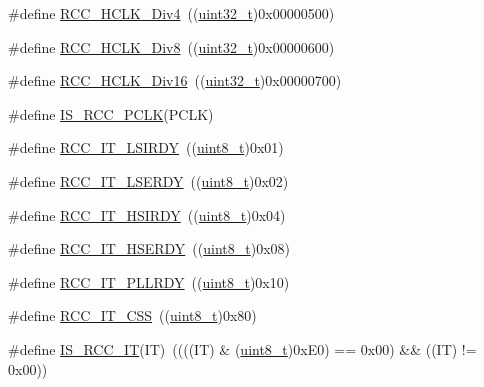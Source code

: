 \begin{DoxyCompactItemize}
\#define \hyperlink{group___a_p_b1___a_p_b2__clock__source_gafd8cf0e32a3ea5648cdc054766bc2017}{R\+C\+C\+\_\+\+H\+C\+L\+K\+\_\+\+Div4}~((\hyperlink{_p_e___types_8h_a33594304e786b158f3fb30289278f5af}{uint32\+\_\+t})0x00000500)
\item 
\#define \hyperlink{group___a_p_b1___a_p_b2__clock__source_gab2e2b6e0b8fe22d6638b672918b22097}{R\+C\+C\+\_\+\+H\+C\+L\+K\+\_\+\+Div8}~((\hyperlink{_p_e___types_8h_a33594304e786b158f3fb30289278f5af}{uint32\+\_\+t})0x00000600)
\item 
\#define \hyperlink{group___a_p_b1___a_p_b2__clock__source_ga6353aaa0b302fdd5d946fd21756e2273}{R\+C\+C\+\_\+\+H\+C\+L\+K\+\_\+\+Div16}~((\hyperlink{_p_e___types_8h_a33594304e786b158f3fb30289278f5af}{uint32\+\_\+t})0x00000700)
\item 
\#define \hyperlink{group___a_p_b1___a_p_b2__clock__source_gab70f1257ea47c1da4def8e351af4d9f2}{I\+S\+\_\+\+R\+C\+C\+\_\+\+P\+C\+LK}(P\+C\+LK)
\item 
\#define \hyperlink{group___r_c_c___interrupt__source_ga2b4ef277c1b71f96e0bef4b9a72fca94}{R\+C\+C\+\_\+\+I\+T\+\_\+\+L\+S\+I\+R\+DY}~((\hyperlink{_p_e___types_8h_aba7bc1797add20fe3efdf37ced1182c5}{uint8\+\_\+t})0x01)
\item 
\#define \hyperlink{group___r_c_c___interrupt__source_gad6b6e78a426850f595ef180d292a673d}{R\+C\+C\+\_\+\+I\+T\+\_\+\+L\+S\+E\+R\+DY}~((\hyperlink{_p_e___types_8h_aba7bc1797add20fe3efdf37ced1182c5}{uint8\+\_\+t})0x02)
\item 
\#define \hyperlink{group___r_c_c___interrupt__source_ga69637e51b71f73f519c8c0a0613d042f}{R\+C\+C\+\_\+\+I\+T\+\_\+\+H\+S\+I\+R\+DY}~((\hyperlink{_p_e___types_8h_aba7bc1797add20fe3efdf37ced1182c5}{uint8\+\_\+t})0x04)
\item 
\#define \hyperlink{group___r_c_c___interrupt__source_gad13eaede352bca59611e6cae68665866}{R\+C\+C\+\_\+\+I\+T\+\_\+\+H\+S\+E\+R\+DY}~((\hyperlink{_p_e___types_8h_aba7bc1797add20fe3efdf37ced1182c5}{uint8\+\_\+t})0x08)
\item 
\#define \hyperlink{group___r_c_c___interrupt__source_ga68d48e7811fb58f2649dce6cf0d823d9}{R\+C\+C\+\_\+\+I\+T\+\_\+\+P\+L\+L\+R\+DY}~((\hyperlink{_p_e___types_8h_aba7bc1797add20fe3efdf37ced1182c5}{uint8\+\_\+t})0x10)
\item 
\#define \hyperlink{group___r_c_c___interrupt__source_ga9bb34a4912d2084dc1c0834eb53aa7a3}{R\+C\+C\+\_\+\+I\+T\+\_\+\+C\+SS}~((\hyperlink{_p_e___types_8h_aba7bc1797add20fe3efdf37ced1182c5}{uint8\+\_\+t})0x80)
\item 
\#define \hyperlink{group___r_c_c___interrupt__source_ga710d72ccf88ddbec09b033c81a571a83}{I\+S\+\_\+\+R\+C\+C\+\_\+\+IT}(IT)~((((IT) \& (\hyperlink{_p_e___types_8h_aba7bc1797add20fe3efdf37ced1182c5}{uint8\+\_\+t})0x\+E0) == 0x00) \&\& ((\+I\+T) != 0x00))

\end{DoxyCompactItemize}
